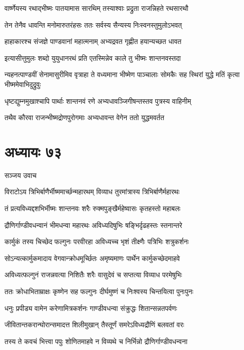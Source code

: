 \twolineshloka
{वार्ष्णेयस्य रथाद्भीष्मः पातयामास सारथिम्}
{तस्याश्वाः प्रद्रुता राजन्निहते रथसारथौ}


\twolineshloka
{तेन तेनैव धावन्ति मनोमारुतरंहसः}
{ततः सर्वस्य सैन्यस्य निःस्वनस्तुमुलोऽभवत्}


\twolineshloka
{हाहाकारश्च संजज्ञे पाण्डवानां महात्मनाम्}
{अभ्यद्रवत गृह्णीत हयान्यच्छत धावत}


\twolineshloka
{इत्यासीत्तुमुलः शब्दो युयुधानरथं प्रति}
{एतस्मिन्नेव काले तु भीष्मः शान्तनवस्तदा}


\threelineshloka
{न्यहनत्पाण्डवीं सेनामासुरीमिव वृत्राहा}
{ते वध्यमाना भीष्मेण पाञ्चालाः सोमकैः सह}
{स्थिरां युद्धे मतिं कृत्वा भीष्ममेवाभिदुद्रुवुः}


\twolineshloka
{धृष्टद्युम्नमुखाश्चापि पार्थाः शान्तनवं रणे}
{अभ्यधावञ्जिगीषन्तस्तव पुत्रस्य वाहिनीम्}


\twolineshloka
{तथैव कौरवा राजन्भीष्मद्रोणपुरोगमाः}
{अभ्यधावन्त वेगेन ततो युद्धमवर्तत}


\chapter{अध्यायः ७३}
\twolineshloka
{सञ्जय उवाच}
{}


\twolineshloka
{विराटोऽय त्रिभिर्बाणैर्भीष्ममार्च्छन्महारथम्}
{विव्याध तुरमांत्रास्य त्रिभिर्बाणैर्महारथः}


\twolineshloka
{तं प्रत्यविध्यद्दशभिर्भीष्मः शान्तनवः शरैः}
{रुक्मपुङ्खैर्महेष्वासः कृतहस्तो महाबलः}


\twolineshloka
{द्रौणिर्गाण्डीवधन्वानं भीमधन्वा महारथः}
{अविध्यदिषुभिः षङ्भिर्दृढहस्तः स्तनान्तरे}


\twolineshloka
{कार्मुकं तस्य चिच्छेद फल्गुनः परवीरहा}
{अविध्यच्च भृशं तीक्ष्णैः पत्रिभिः शत्रुकर्शनः}


\twolineshloka
{सोऽन्यत्कार्मुकमादाय वेगवान्क्रोधमूर्च्छितः}
{अमृष्यमाणः पार्थेन कार्मुकच्छेदमाहवे}


\twolineshloka
{अविध्यत्फल्गुनं राजन्नवत्या निशितैः शरैः}
{वासुदेवं च सप्तत्या विव्याध परमेषुभिः}


\twolineshloka
{ततः क्रोधाभिताम्राक्षः कृष्णेन सह फल्गुनः}
{दीर्घमुष्णं च निःश्वस्य चिन्तयित्वा पुनःपुनः}


\twolineshloka
{धनुः प्रपीड्य वामेन करेणामित्रकर्शनः}
{गाण्डीवधन्वा संक्रुद्धः शितान्सन्नतपर्वणः}


\twolineshloka
{जीवितान्तकरान्घोरान्समादत्त शिलीमुखान्}
{तैस्तूर्णं समरेऽविध्यद्रौणिं बलवतां वरः}


\twolineshloka
{तस्य ते कवचं भित्त्वा पपुः शोणितमाहवे}
{न विव्यथे च निर्भिन्नो द्रौणिर्गाण्डीवधन्वना}



